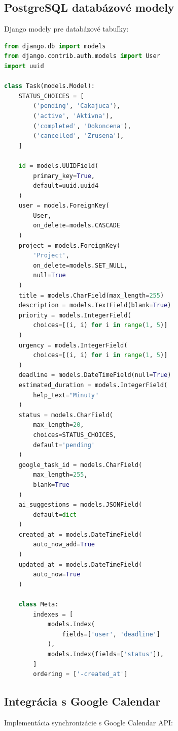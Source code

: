 \documentclass[10pt,twocolumn,twoside,slovak,a4paper]{article}
\begin{document}
\subsection{PostgreSQL databázové modely}

Django modely pre databázové tabuľky:

\begin{lstlisting}[language=Python, caption=Django modely pre TIMA]
from django.db import models
from django.contrib.auth.models import User
import uuid

class Task(models.Model):
    STATUS_CHOICES = [
        ('pending', 'Cakajuca'),
        ('active', 'Aktivna'),
        ('completed', 'Dokoncena'),
        ('cancelled', 'Zrusena'),
    ]
    
    id = models.UUIDField(
        primary_key=True,
        default=uuid.uuid4
    )
    user = models.ForeignKey(
        User, 
        on_delete=models.CASCADE
    )
    project = models.ForeignKey(
        'Project',
        on_delete=models.SET_NULL,
        null=True
    )
    title = models.CharField(max_length=255)
    description = models.TextField(blank=True)
    priority = models.IntegerField(
        choices=[(i, i) for i in range(1, 5)]
    )
    urgency = models.IntegerField(
        choices=[(i, i) for i in range(1, 5)]
    )
    deadline = models.DateTimeField(null=True)
    estimated_duration = models.IntegerField(
        help_text="Minuty"
    )
    status = models.CharField(
        max_length=20,
        choices=STATUS_CHOICES,
        default='pending'
    )
    google_task_id = models.CharField(
        max_length=255,
        blank=True
    )
    ai_suggestions = models.JSONField(
        default=dict
    )
    created_at = models.DateTimeField(
        auto_now_add=True
    )
    updated_at = models.DateTimeField(
        auto_now=True
    )
    
    class Meta:
        indexes = [
            models.Index(
                fields=['user', 'deadline']
            ),
            models.Index(fields=['status']),
        ]
        ordering = ['-created_at']
\end{lstlisting}

\subsection{Integrácia s Google Calendar}

Implementácia synchronizácie s Google Calendar API:
\end{document}
